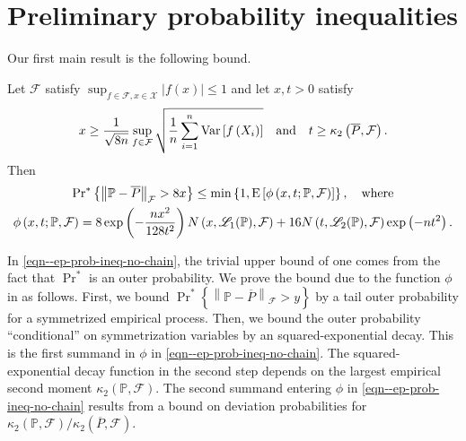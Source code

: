 
\section{Preliminary probability inequalities}

Our first main result is the following bound.

\begin{theorem}
\label{thm--ep-prob-ineq-no-chain}
Let \(\mathcal{F}\) satisfy \(\sup_{f \in \mathcal{F}, x \in \mathcal{X}} |f
(x)| \leq 1\) and let \(x, t > 0\) satisfy
\begin{equation*}
  x \geq \frac{1}{\sqrt{8 n}} \sup_{f \in \mathcal{F}} \sqrt{\frac{1}{n} \sum_{i
  = 1}^{n} \mathrm{Var} \left[ f \left( X_{i} \right) \right]} \quad \text{and} \quad
  t \geq \kappa_{2} \left( \overline{P}, \mathcal{F} \right).
\end{equation*}
Then
\begin{equation}
  \begin{gathered}
    \mathrm{Pr}^{\ast} \left\{ \left\| \mathbb{P} - \overline{P}
    \right\|_{\mathcal{F}} > 8 x \right\} \leq
    \min \left\{ 1, \mathrm{E} \left[ \phi \left( x, t; \mathbb{P}, \mathcal{F} \right)
    \right] \right\}, \quad \text{where}
    \\
    \phi \left( x, t; \mathbb{P}, \mathcal{F} \right) =
    8 \exp \left( - \frac{n x^{2}}{128 t^{2}} \right) N \left( x,
    \mathscr{L}_{1} (\mathbb{P}), \mathcal{F} \right) +
    16 N \left( t, \mathscr{L}_{2} (\mathbb{P}), \mathcal{F} \right) \exp \left(
    - n t^{2} \right).
  \end{gathered}
  \label{eqn--ep-prob-ineq-no-chain}
\end{equation}
\end{theorem}

In \eqref{eqn--ep-prob-ineq-no-chain}, the trivial upper bound of one comes from
the fact that \(\Pr^{\ast}\) is an outer probability.
We prove the bound due to the function \(\phi\) in
 as follows.
First, we bound \(\Pr^{\ast} \left\{ \left\| \mathbb{P} - \overline{P}
\right\|_{\mathcal{F}} > y \right\}\) by a tail outer probability for a
symmetrized empirical process.
Then, we bound the outer probability ``conditional'' on symmetrization variables
by an squared-exponential decay.
This is the first summand in \(\phi\) in \eqref{eqn--ep-prob-ineq-no-chain}.
The squared-exponential decay function in the second step depends on the largest
empirical second moment \(\kappa_{2} (\mathbb{P}, \mathcal{F})\).
The second summand entering \(\phi\) in \eqref{eqn--ep-prob-ineq-no-chain}
results from a bound on deviation probabilities for
\(\kappa_{2} (\mathbb{P}, \mathcal{F}) / \kappa_{2} (\overline{P},
\mathcal{F})\).

